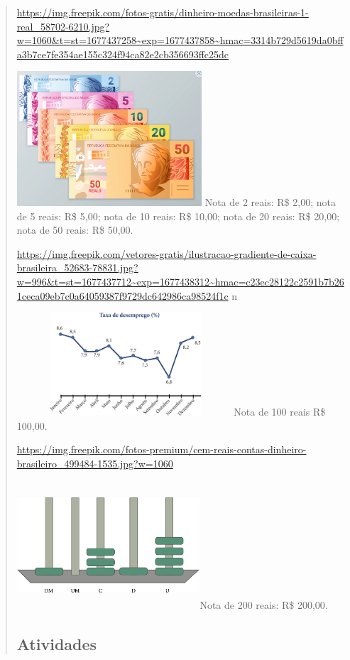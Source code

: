 \begin{enumerate}
\begin{escolha}
\begin{enumerate}
\begin{itemize}
\begin{itemize}
\begin{escolha}
\begin{quote}
\url{https://img.freepik.com/fotos-gratis/dinheiro-moedas-brasileiras-1-real_58702-6210.jpg?w=1060\&t=st=1677437258~exp=1677437858~hmac=3314b729d5619da0bffa3b7ce7fe354ae155c324f94ca82e2cb356693ffc25dc}

\includegraphics[width=2.71068in,height=1.97500in]{media/image78.png}
Nota de 2 reais: R\$ 2,00; nota de 5 reais: R\$ 5,00; nota de 10 reais: R\$ 10,00; nota de 20 reais: R\$ 20,00; nota de 50 reais: R\$ 50,00.

\url{https://img.freepik.com/vetores-gratis/ilustracao-gradiente-de-caixa-brasileira_52683-78831.jpg?w=996\&t=st=1677437712~exp=1677438312~hmac=c23ec28122c2591b7b261ceca09eb7c0a64059387f9729dc642986ca98524f1c}
n

\includegraphics[width=3.18285in,height=1.50833in]{media/image79.png}Nota
de 100 reais R\$ 100,00.

\url{https://img.freepik.com/fotos-premium/cem-reais-contas-dinheiro-brasileiro_499484-1535.jpg?w=1060}

\includegraphics[width=2.68333in,height=1.88913in]{media/image80.png}Nota
de 200 reais: R\$ 200,00.

\subsection{Atividades}\label{atividades-5}


\end{quote}
\end{escolha}
\end{itemize}
\end{itemize}
\end{enumerate}
\end{escolha}
\end{enumerate}
